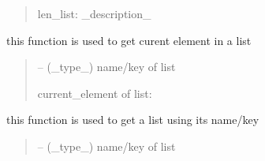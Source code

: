 \documentclass[letterpaper,10pt,english]{sphinxmanual}
\begin{document}
\begin{savenotes}
\begin{fulllineitems}
\begin{savenotes}
\begin{fulllineitems}
\begin{quote}
\begin{description}
\sphinxAtStartPar
len\_list: \_description\_

\end{description}\end{quote}

\end{fulllineitems}\end{savenotes}


\begin{savenotes}\begin{fulllineitems}
\label{\detokenize{setting/utils/move_on_list:oxin.utils.move_on_list.moveOnList.get_current}}
\pysigstartsignatures
{}
\pysigstopsignatures
\sphinxAtStartPar
this function is used to get curent element in a list
\begin{quote}\begin{description}
\sphinxAtStartPar
{} – (\_type\_) name/key of list

\sphinxAtStartPar
current\_element of list:

\end{description}\end{quote}

\end{fulllineitems}\end{savenotes}


\begin{savenotes}\begin{fulllineitems}
\label{\detokenize{setting/utils/move_on_list:oxin.utils.move_on_list.moveOnList.get_list}}
\pysigstartsignatures
{}
\pysigstopsignatures
\sphinxAtStartPar
this function is used to get a list using its name/key
\begin{quote}\begin{description}
\sphinxAtStartPar
{} – (\_type\_) name/key of list


\end{description}
\end{quote}
\end{fulllineitems}
\end{savenotes}
\end{fulllineitems}
\end{savenotes}
\end{document}
